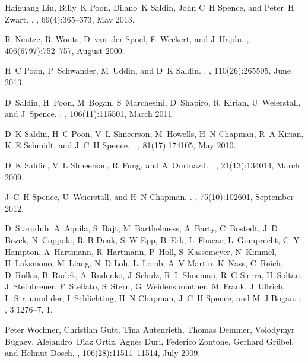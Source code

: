 \documentclass [11pt,fleqn]{article}
\begin{document}
\begin{thebibliography}{10}
Haiguang Liu, Billy~K Poon, Dilano~K Saldin, John C~H Spence, and Peter~H
  Zwart.
.
, 69(4):365--373, May 2013.

R~Neutze, R~Wouts, D~van~der Spoel, E~Weckert, and J~Hajdu.
, 406(6797):752--757, August 2000.

H~C Poon, P~Schwander, M~Uddin, and D~K Saldin.
.
, 110(26):265505, June 2013.

D~Saldin, H~Poon, M~Bogan, S~Marchesini, D~Shapiro, R~Kirian, U~Weierstall, and
  J~Spence.
.
, 106(11):115501, March 2011.

D~K Saldin, H~C Poon, V~L Shneerson, M~Howells, H~N Chapman, R~A Kirian, K~E
  Schmidt, and J~C~H Spence.
.
, 81(17):174105, May 2010.

D~K Saldin, V~L Shneerson, R~Fung, and A~Ourmazd.
.
, 21(13):134014, March 2009.

J~C~H Spence, U~Weierstall, and H~N Chapman.
.
, 75(10):102601, September 2012.

D~Starodub, A~Aquila, S~Bajt, M~Barthelmess, A~Barty, C~Bostedt, J~D Bozek,
  N~Coppola, R~B Doak, S~W Epp, B~Erk, L~Foucar, L~Gumprecht, C~Y Hampton,
  A~Hartmann, R~Hartmann, P~Holl, S~Kassemeyer, N~Kimmel, H~Laksmono, M~Liang,
  N~D Loh, L~Lomb, A~V Martin, K~Nass, C~Reich, D~Rolles, B~Rudek, A~Rudenko,
  J~Schulz, R~L Shoeman, R~G Sierra, H~Soltau, J~Steinbrener, F~Stellato,
  S~Stern, G~Weidenspointner, M~Frank, J~Ullrich, L~Str~uuml der,
  I~Schlichting, H~N Chapman, J~C~H Spence, and M~J Bogan.
.
, 3:1276--7, 1.

Peter Wochner, Christian Gutt, Tina Autenrieth, Thomas Demmer, Volodymyr
  Bugaev, Alejandro~D{\'\i}az Ortiz, Agn{\`e}s Duri, Federico Zontone, Gerhard
  Gr{\"u}bel, and Helmut Dosch.
, 106(28):11511--11514, July 2009.

\end{thebibliography}
%
%
\end{document}
